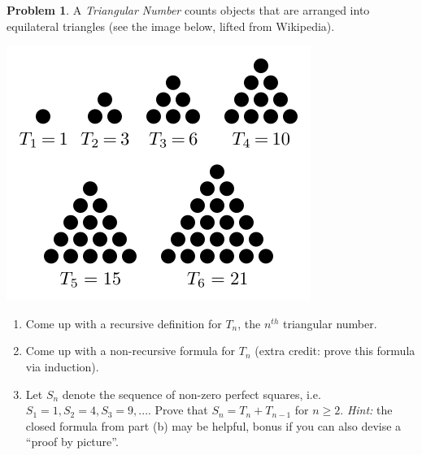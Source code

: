 \documentclass{article}
\numberwithin{pic}{section}
\numberwithin{lem}{section}
\numberwithin{thm}{section}
\numberwithin{cor}{section}
\theoremstyle{definition}
\numberwithin{ex}{section}
\numberwithin{defn}{section}
\theoremstyle{definition}
\newtheorem{prob}{Problem}
\theoremstyle{remark}
\begin{document}
\begin{prob}
  A \textit{Triangular Number} counts objects that are arranged into equilateral triangles (see the image below, lifted from Wikipedia).\\
  \begin{center}
    \includegraphics[scale=0.5]{TriNums}
  \end{center}
  \begin{enumerate}
  \item Come up with a recursive definition for $T_n$, the $n^{th}$ triangular number.
  \item Come up with a non-recursive formula for $T_n$ (extra credit: prove this formula via induction).
  \item Let $S_n$ denote the sequence of non-zero perfect squares, i.e. $S_1 = 1, S_2 = 4, S_3 = 9, ...$. Prove that $S_n = T_n + T_{n-1}$ for $n \geq 2$. \textit{Hint:} the closed formula from part (b) may be helpful, bonus if you can also devise a ``proof by picture''.
  \end{enumerate}
\end{prob}
\end{document}
